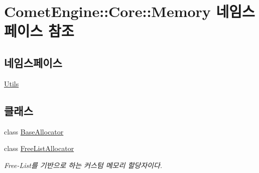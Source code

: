 \hypertarget{namespace_comet_engine_1_1_core_1_1_memory}{}\section{Comet\+Engine\+:\+:Core\+:\+:Memory 네임스페이스 참조}
\label{namespace_comet_engine_1_1_core_1_1_memory}
\subsection*{네임스페이스}
\begin{DoxyCompactItemize}
\item 
 \hyperlink{namespace_comet_engine_1_1_core_1_1_memory_1_1_utils}{Utils}
\end{DoxyCompactItemize}
\subsection*{클래스}
\begin{DoxyCompactItemize}
\item 
class \hyperlink{class_comet_engine_1_1_core_1_1_memory_1_1_base_allocator}{Base\+Allocator}
\item 
class \hyperlink{class_comet_engine_1_1_core_1_1_memory_1_1_free_list_allocator}{Free\+List\+Allocator}
\begin{DoxyCompactList}\small\item\em Free-\/\+List를 기반으로 하는 커스텀 메모리 할당자이다. \end{DoxyCompactList}\end{DoxyCompactItemize}
